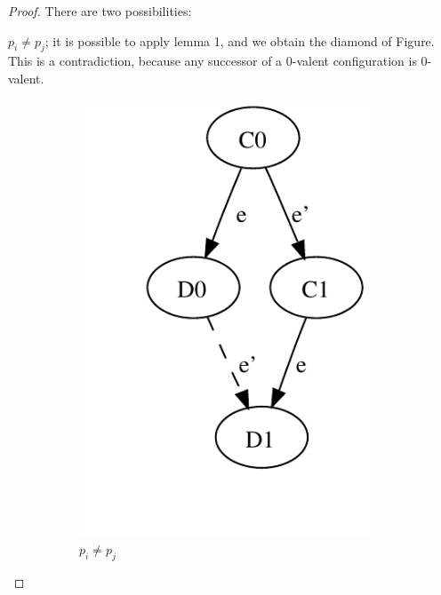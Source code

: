 \documentclass[12pt]{article}
\begin{document}
\begin{proof}
There are two possibilities:
\BI
\item $p_i \neq p_j$; it is possible to apply lemma 1, and we obtain
  the diamond of Figure. This is a contradiction, because
  any successor of a 0-valent configuration is 0-valent.
\begin{figure}
\begin{subfigure}[b]{0.30\textwidth}
\begin{center}
\includegraphics[width=0.95\textwidth]{figs/06/consensus-fig2.pdf}
\end{center}
\caption{$p_i \neq p_j$}
\end{subfigure}
\begin{subfigure}[b]{0.70\textwidth}
\begin{center}

\end{center}
\end{subfigure}
\end{figure}
\end{proof}
\end{document}

